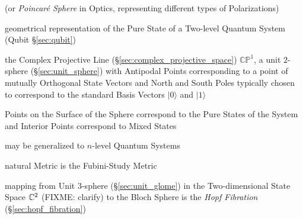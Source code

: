 (or \emph{Poincar\'e Sphere} in Optics, representing different types of
Polarizations)

geometrical representation of the Pure State of a Two-level Quantum System
(Qubit \S\ref{sec:qubit})

the Complex Projective Line (\S\ref{sec:complex_projective_space})
$\mathbb{CP}^1$, a unit $2$-sphere (\S\ref{sec:unit_sphere}) with Antipodal
Points corresponding to a point of mutually Orthogonal State Vectors and North
and South Poles typically chosen to correspond to the standard Basis Vectors
$|0\rangle$ and $|1\rangle$

Points on the Surface of the Sphere correspond to the Pure States of the System
and Interior Points correspond to Mixed States

may be generalized to $n$-level Quantum Systems

natural Metric is the Fubini-Study Metric

mapping from Unit $3$-sphere (\S\ref{sec:unit_glome}) in the Two-dimensional
State Space $\mathbb{C}^2$ (FIXME: clarify) to the Bloch Sphere is the \emph{Hopf
  Fibration} (\S\ref{sec:hopf_fibration})
